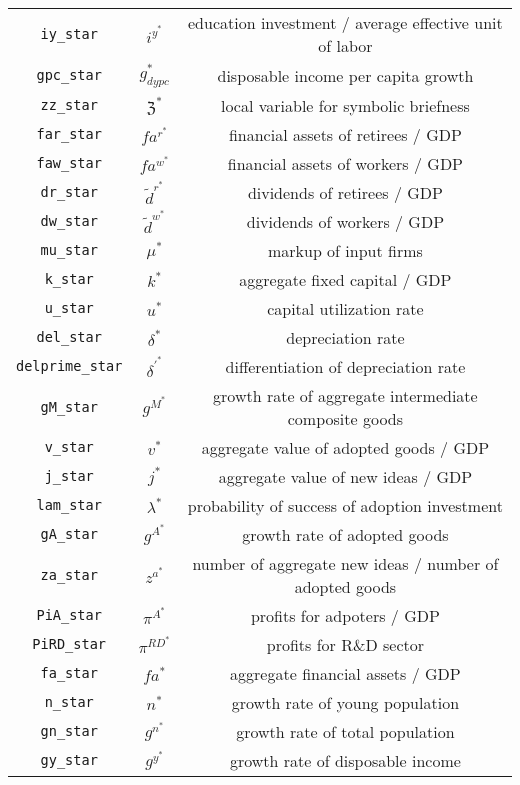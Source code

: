 \begin{center}
\begin{longtable}{ccc}
\texttt{iy\_star} & ${i^y^*}$ & education investment / average effective unit of labor\\
\texttt{gpc\_star} & ${g_{dypc}^*}$ & disposable income per capita growth\\
\texttt{zz\_star} & ${\mathfrak{Z}^*}$ & local variable for symbolic briefness\\
\texttt{far\_star} & ${fa^r^*}$ & financial assets of retirees / GDP\\
\texttt{faw\_star} & ${fa^w^*}$ & financial assets of workers / GDP\\
\texttt{dr\_star} & $\tilde{d}^r^*$ & dividends of retirees / GDP\\
\texttt{dw\_star} & $\tilde{d}^w^*$ & dividends of workers / GDP\\
\texttt{mu\_star} & ${\mu^*}$ & markup of input firms\\
\texttt{k\_star} & ${k^*}$ & aggregate fixed capital / GDP\\
\texttt{u\_star} & ${u^*}$ & capital utilization rate\\
\texttt{del\_star} & ${\delta^*}$ & depreciation rate\\
\texttt{delprime\_star} & ${\delta^\prime^*}$ & differentiation of depreciation rate\\
\texttt{gM\_star} & ${g^M^*}$ & growth rate of aggregate intermediate composite goods\\
\texttt{v\_star} & ${v^*}$ & aggregate value of adopted goods / GDP\\
\texttt{j\_star} & ${j^*}$ & aggregate value of new ideas / GDP\\
\texttt{lam\_star} & ${\lambda^*}$ & probability of success of adoption investment\\
\texttt{gA\_star} & ${g^A^*}$ & growth rate of adopted goods\\
\texttt{za\_star} & ${z^a^*}$ & number of aggregate new ideas / number of adopted goods\\
\texttt{PiA\_star} & ${\pi^A^*}$ & profits for adpoters / GDP\\
\texttt{PiRD\_star} & ${\pi^{RD}^*}$ & profits for R\&D sector\\
\texttt{fa\_star} & ${fa^*}$ & aggregate financial assets / GDP\\
\texttt{n\_star} & ${n^*}$ & growth rate of young population\\
\texttt{gn\_star} & ${g^n^*}$ & growth rate of total population\\
\texttt{gy\_star} & ${g^y^*}$ & growth rate of disposable income\\

\end{longtable}
\end{center}
